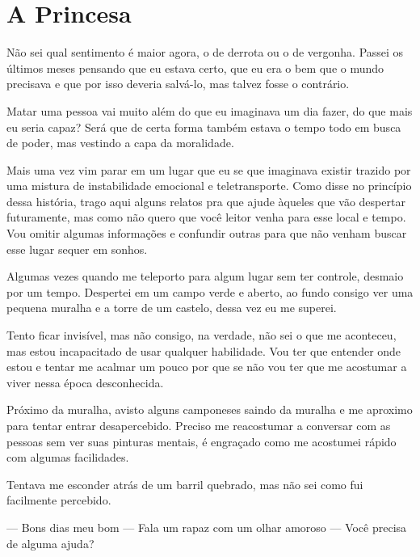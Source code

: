 
\chapter{A Princesa}




Não sei qual sentimento é maior agora, o de derrota ou o de vergonha. Passei os últimos meses pensando que eu estava certo, que eu era o bem que o mundo precisava e que por isso deveria salvá-lo, mas talvez fosse o contrário.

Matar uma pessoa vai muito além do que eu imaginava um dia fazer, do que mais eu seria capaz? Será que de certa forma também estava o tempo todo em busca de poder, mas vestindo a capa da moralidade.

Mais uma vez vim parar em um lugar que eu se que imaginava existir trazido por uma mistura de instabilidade emocional e teletransporte. Como disse no princípio dessa história, trago aqui alguns relatos pra que ajude àqueles que vão despertar futuramente, mas como não quero que você leitor venha para esse local e tempo. Vou omitir algumas informações e confundir outras para que não venham buscar esse lugar sequer em sonhos.

Algumas vezes quando me teleporto para algum lugar sem ter controle, desmaio por um tempo. Despertei em um campo verde e aberto, ao fundo consigo ver uma pequena muralha e a torre de um castelo, dessa vez eu me superei.

Tento ficar invisível, mas não consigo, na verdade, não sei o que me aconteceu, mas estou incapacitado de usar qualquer habilidade. Vou ter que entender onde estou e tentar me acalmar um pouco por que se não vou ter que me acostumar a viver nessa época desconhecida.

Próximo da muralha, avisto alguns camponeses saindo da muralha e me aproximo para tentar entrar desapercebido. Preciso me reacostumar a conversar com as pessoas sem ver suas pinturas mentais, é engraçado como me acostumei rápido com algumas facilidades.

Tentava me esconder atrás de um barril quebrado, mas não sei como fui facilmente percebido.

— Bons dias meu bom — Fala um rapaz com um olhar amoroso — Você precisa de alguma ajuda?

